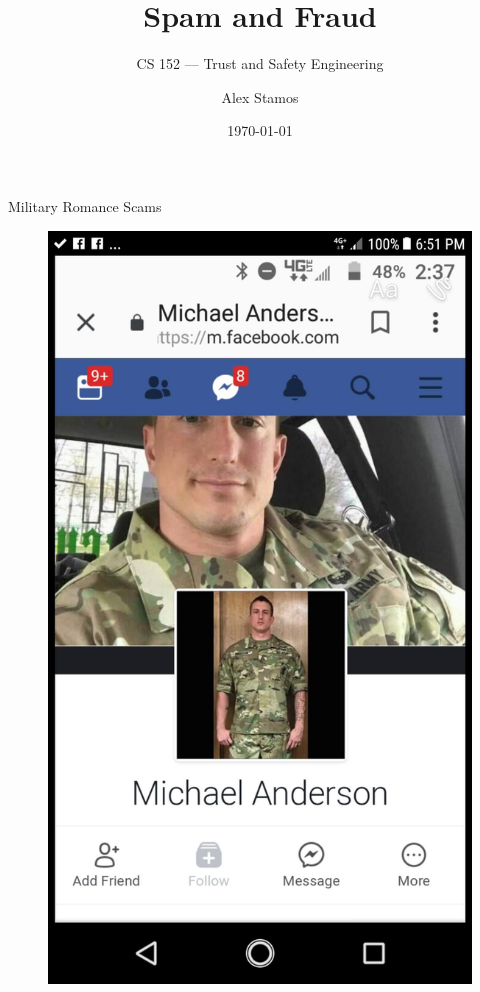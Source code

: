 \documentclass[nobackground,dvipsnames,table,aspectratio=169]{beamer}
\title{Spam and Fraud}
\subtitle{CS 152 --- Trust and Safety Engineering}
\author[A. Stamos]{Alex Stamos}
\institute[Stanford University]{Stanford Cyber Policy Center}
\date[2022]{\today}
\begin{document}
\begin{frame}
    \titlepage
\end{frame}

\begin{frame}{Military Romance Scams}
    \begin{figure}
        \centering
        \includegraphics[height=0.85\textheight]{military-romance-scam}
    \end{figure}
\end{frame}
\end{document}
